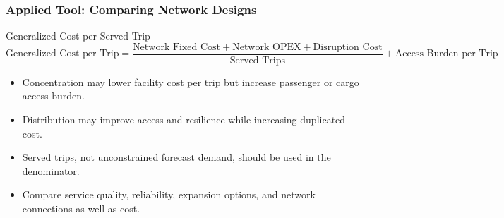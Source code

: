 \documentclass{beamer}
\begin{document}
\begin{frame}[t]
\frametitle{Applied Tool: Comparing Network Designs}
\begin{block}{Generalized Cost per Served Trip}
\[
\text{Generalized Cost per Trip}
=
\frac{\text{Network Fixed Cost}+\text{Network OPEX}+\text{Disruption Cost}}{\text{Served Trips}}
+\text{Access Burden per Trip}
\]
\end{block}
\begin{itemize}
\item Concentration may lower facility cost per trip but increase passenger or cargo access burden.
\item Distribution may improve access and resilience while increasing duplicated cost.
\item Served trips, not unconstrained forecast demand, should be used in the denominator.
\item Compare service quality, reliability, expansion options, and network connections as well as cost.
\end{itemize}
\end{frame}
\end{document}
